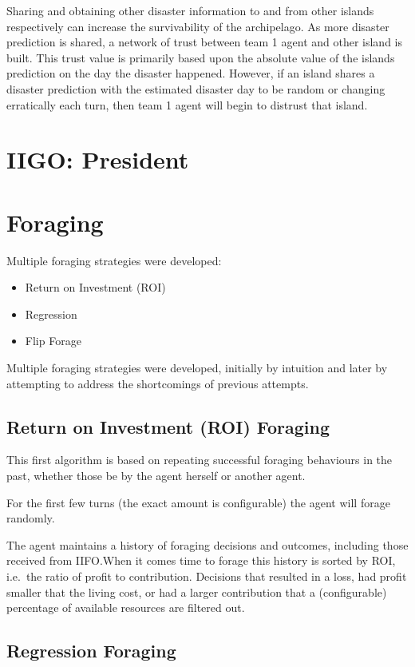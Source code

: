 Sharing and obtaining other disaster information to and from other islands respectively can increase the survivability of the archipelago. As more disaster prediction is shared, a network of trust between team 1 agent and other island is built. This trust value is primarily based upon the absolute value of the islands prediction on the day the disaster happened. However, if an island shares a disaster prediction with the estimated disaster day to be random or changing erratically each turn, then team 1 agent will begin to distrust that island. 

\section{IIGO: President}

\section{Foraging}
Multiple foraging strategies were developed: 
\begin{itemize}
    \item Return on Investment (ROI)
    \item Regression
    \item Flip Forage
\end{itemize}

Multiple foraging strategies were developed, initially by intuition and later by attempting to address the shortcomings of previous attempts.

\subsection{Return on Investment (ROI) Foraging}%
\label{sec:forage-roi}

This first algorithm is based on repeating successful foraging behaviours in the past, whether those be by the agent herself or another agent.

For the first few turns (the exact amount is configurable) the agent will forage randomly.

The agent maintains a history of foraging decisions and outcomes, including those received from IIFO.\@ When it comes time to forage this history is sorted by ROI, i.e.\ the ratio of profit to contribution. Decisions that resulted in a loss, had profit smaller that the living cost, or had a larger contribution that a (configurable) percentage of available resources are filtered out.

\subsection{Regression Foraging}%
\label{sec:forage-regression}


